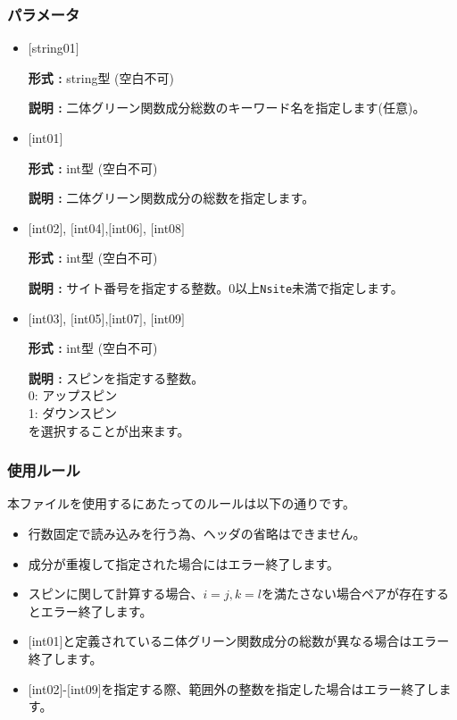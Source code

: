 \subsubsection{パラメータ}
 \begin{itemize}

   \item  $[$string01$]$
   
    {\bf 形式 :} string型 (空白不可)

   {\bf 説明 :} 二体グリーン関数成分総数のキーワード名を指定します(任意)。

   \item  $[$int01$]$
   
    {\bf 形式 :} int型 (空白不可)

   {\bf 説明 :} 二体グリーン関数成分の総数を指定します。

  \item  $[$int02$]$, $[$int04$]$,$[$int06$]$, $[$int08$]$

 {\bf 形式 :} int型 (空白不可)

{\bf 説明 :} サイト番号を指定する整数。0以上\verb|Nsite|{未満}で指定します。
 
  \item  $[$int03$]$, $[$int05$]$,$[$int07$]$, $[$int09$]$

 {\bf 形式 :} int型 (空白不可)

{\bf 説明 :} スピンを指定する整数。\\
0: アップスピン\\
1: ダウンスピン\\
を選択することが出来ます。

\end{itemize}

\subsubsection{使用ルール}
本ファイルを使用するにあたってのルールは以下の通りです。
\begin{itemize}
\item 行数固定で読み込みを行う為、ヘッダの省略はできません。
\item 成分が重複して指定された場合にはエラー終了します。
\item {スピンに関して計算する場合、$i=j, k=l$を満たさない場合ペアが存在するとエラー終了します。}
\item $[$int01$]$と定義されているニ体グリーン関数成分の総数が異なる場合はエラー終了します。
\item $[$int02$]$-$[$int09$]$を指定する際、範囲外の整数を指定した場合はエラー終了します。
\end{itemize}

